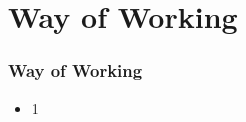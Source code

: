 \section{Way of Working}
\begin{frame}\frametitle{Way of Working}
	\begin{itemize}
		\item 1
	\end{itemize}
\end{frame}